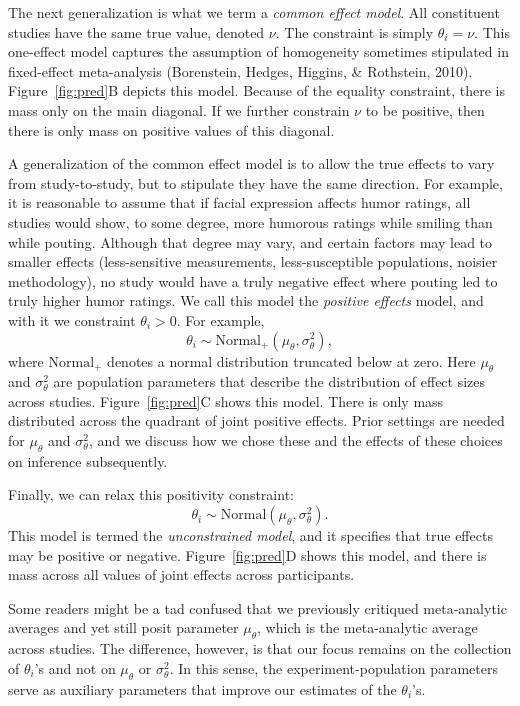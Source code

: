 \documentclass[english,man]{apa6}
\theoremstyle{definition}
\theoremstyle{definition}
\theoremstyle{remark}
\begin{document}
The next generalization is what we term a \emph{common effect model}.
All constituent studies have the same true value, denoted \(\nu\). The
constraint is simply \(\theta_i=\nu\). This one-effect model captures
the assumption of homogeneity sometimes stipulated in fixed-effect
meta-analysis (Borenstein, Hedges, Higgins, \& Rothstein, 2010).
Figure~\ref{fig:pred}B depicts this model. Because of the equality
constraint, there is mass only on the main diagonal. If we further
constrain \(\nu\) to be positive, then there is only mass on positive
values of this diagonal.

A generalization of the common effect model is to allow the true effects
to vary from study-to-study, but to stipulate they have the same
direction. For example, it is reasonable to assume that if facial
expression affects humor ratings, all studies would show, to some
degree, more humorous ratings while smiling than while pouting. Although
that degree may vary, and certain factors may lead to smaller effects
(less-sensitive measurements, less-susceptible populations, noisier
methodology), no study would have a truly negative effect where pouting
led to truly higher humor ratings. We call this model the \emph{positive
effects} model, and with it we constraint \(\theta_i>0\). For example,
\[
\theta_i \sim \mbox{Normal}_+(\mu_\theta,\sigma^2_\theta),
\] where \(\mbox{Normal}_+\) denotes a normal distribution truncated
below at zero. Here \(\mu_\theta\) and \(\sigma^2_\theta\) are
population parameters that describe the distribution of effect sizes
across studies. Figure~\ref{fig:pred}C shows this model. There is only
mass distributed across the quadrant of joint positive effects. Prior
settings are needed for \(\mu_\theta\) and \(\sigma^2_\theta\), and we
discuss how we chose these and the effects of these choices on inference
subsequently.

Finally, we can relax this positivity constraint: \[
\theta_i \sim \mbox{Normal}(\mu_\theta,\sigma^2_\theta).
\] This model is termed the \emph{unconstrained model}, and it specifies
that true effects may be positive or negative. Figure~\ref{fig:pred}D
shows this model, and there is mass across all values of joint effects
across participants.

Some readers might be a tad confused that we previously critiqued
meta-analytic averages and yet still posit parameter \(\mu_\theta\),
which is the meta-analytic average across studies. The difference,
however, is that our focus remains on the collection of \(\theta_i\)'s
and not on \(\mu_\theta\) or \(\sigma^2_\theta\). In this sense, the
experiment-population parameters serve as auxiliary parameters that
improve our estimates of the \(\theta_i\)'s.
\end{document}
